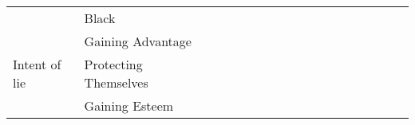 \begin{table*}[!h]
{\begin{tabular}{l|l|l|l|l|l|l|l|l|l|l|l|l|l|l|l|l|l}
                                                        & Black                   & \multicolumn{1}{l|}{} & \multicolumn{1}{l|}{}                  & \multicolumn{1}{l|}{} & \multicolumn{1}{l|}{}                  & \multicolumn{1}{l|}{} & \multicolumn{1}{l|}{}                  & \multicolumn{1}{l|}{} &                   & \multicolumn{1}{l|}{} & \multicolumn{1}{l|}{}                  & \multicolumn{1}{l|}{} & \multicolumn{1}{l|}{}                  & \multicolumn{1}{l|}{} & \multicolumn{1}{l|}{}                  & \multicolumn{1}{l|}{} &                   \\ \cline{1-18} 
                        \multirow{6}{*}{Intent of lie}  & Gaining Advantage       & \multicolumn{1}{l|}{} & \multicolumn{1}{l|}{\multirow{6}{*}{}} & \multicolumn{1}{l|}{} & \multicolumn{1}{l|}{\multirow{6}{*}{}} & \multicolumn{1}{l|}{} & \multicolumn{1}{l|}{\multirow{6}{*}{}} & \multicolumn{1}{l|}{} & \multirow{6}{*}{} & \multicolumn{1}{l|}{} & \multicolumn{1}{l|}{\multirow{6}{*}{}} & \multicolumn{1}{l|}{} & \multicolumn{1}{l|}{\multirow{6}{*}{}} & \multicolumn{1}{l|}{} & \multicolumn{1}{l|}{\multirow{6}{*}{}} & \multicolumn{1}{l|}{} & \multirow{6}{*}{} \\ \cline{2-3} \cline{5-5} \cline{7-7} \cline{9-9} \cline{11-11} \cline{13-13} \cline{15-15} \cline{17-17}
                                                        & Protecting Themselves   & \multicolumn{1}{l|}{} & \multicolumn{1}{l|}{}                  & \multicolumn{1}{l|}{} & \multicolumn{1}{l|}{}                  & \multicolumn{1}{l|}{} & \multicolumn{1}{l|}{}                  & \multicolumn{1}{l|}{} &                   & \multicolumn{1}{l|}{} & \multicolumn{1}{l|}{}                  & \multicolumn{1}{l|}{} & \multicolumn{1}{l|}{}                  & \multicolumn{1}{l|}{} & \multicolumn{1}{l|}{}                  & \multicolumn{1}{l|}{} &                   \\ \cline{2-3} \cline{5-5} \cline{7-7} \cline{9-9} \cline{11-11} \cline{13-13} \cline{15-15} \cline{17-17}
                                                        & Gaining Esteem          & \multicolumn{1}{l|}{} & \multicolumn{1}{l|}{}                  & \multicolumn{1}{l|}{} & \multicolumn{1}{l|}{}                  & \multicolumn{1}{l|}{} & \multicolumn{1}{l|}{}                  & \multicolumn{1}{l|}{} &                   & \multicolumn{1}{l|}{} & \multicolumn{1}{l|}{}                  & \multicolumn{1}{l|}{} & \multicolumn{1}{l|}{}                  & \multicolumn{1}{l|}{} & \multicolumn{1}{l|}{}                  & \multicolumn{1}{l|}{} &                   \\ \cline{2-3} \cline{5-5} \cline{7-7} \cline{9-9} \cline{11-11} \cline{13-13} \cline{15-15} \cline{17-17}

\end{tabular}}
\end{table*}
